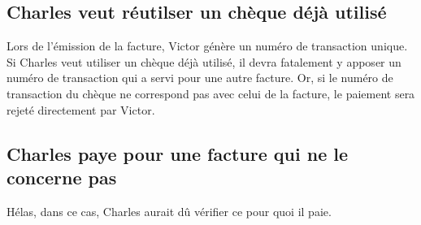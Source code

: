 \documentclass[oneside,10pt]{article}
\begin{document}
\subsection{Charles veut r\'eutilser un ch\`eque d\'ej\`a utilis\'e}
Lors de l'\'emission de la facture, Victor g\'en\`ere un num\'ero de transaction unique.
Si Charles veut utiliser un ch\`eque d\'ej\`a utilis\'e, il devra fatalement y apposer un num\'ero de transaction qui a servi pour une autre facture.
Or, si le num\'ero de transaction du ch\`eque ne correspond pas avec celui de la facture, le paiement sera rejet\'e directement par Victor.

\subsection{Charles paye pour une facture qui ne le concerne pas}
H\'elas, dans ce cas, Charles aurait d\^u v\'erifier ce pour quoi il paie.
\end{document}
